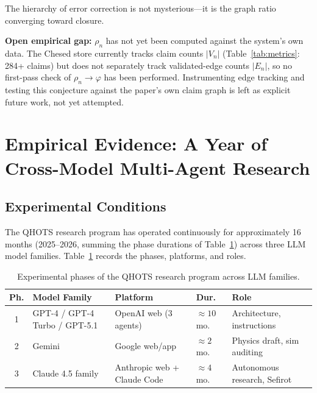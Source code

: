 \documentclass[11pt]{article}
\theoremstyle{definition}
\theoremstyle{remark}
\begin{document}
The hierarchy of error correction is not mysterious---it is the graph ratio
converging toward closure.

\medskip
\noindent\textbf{Open empirical gap:} $\rho_n$ has not yet been computed
against the system's own data.  The Chesed store currently tracks claim
counts $|V_n|$ (Table~\ref{tab:metrics}: 284+ claims) but does not separately
track validated-edge counts $|E_n|$, so no first-pass check of $\rho_n \to
\varphi$ has been performed.  Instrumenting edge tracking and testing this
conjecture against the paper's own claim graph is left as explicit future
work, not yet attempted.

\section{Empirical Evidence: A Year of Cross-Model Multi-Agent Research}
\label{sec:empirical}

\subsection{Experimental Conditions}
\label{sec:experimental-conditions}

The QHOTS research program has operated continuously for approximately 16
months (2025--2026, summing the phase durations of
Table~\ref{tab:experimental-phases}) across three LLM model families.
Table~\ref{tab:experimental-phases} records the phases, platforms, and roles.

\begin{table}[ht]
\centering
\caption{Experimental phases of the QHOTS research program across LLM families.}
\label{tab:experimental-phases}
\begin{tabular}{@{}cp{3.2cm}p{3.2cm}ll@{}}
\toprule
\textbf{Ph.} & \textbf{Model Family} & \textbf{Platform}
  & \textbf{Dur.} & \textbf{Role} \\
\midrule
1 & GPT-4 / GPT-4 Turbo / GPT-5.1 & OpenAI web (3 agents)
  & ${\approx}10$ mo. & Architecture, instructions \\
2 & Gemini & Google web/app
  & ${\approx}2$ mo.  & Physics draft, sim auditing \\
3 & Claude 4.5 family & Anthropic web + Claude Code
  & ${\approx}4$ mo.  & Autonomous research, Sefirot \\
\bottomrule
\end{tabular}
\end{table}
\end{document}

